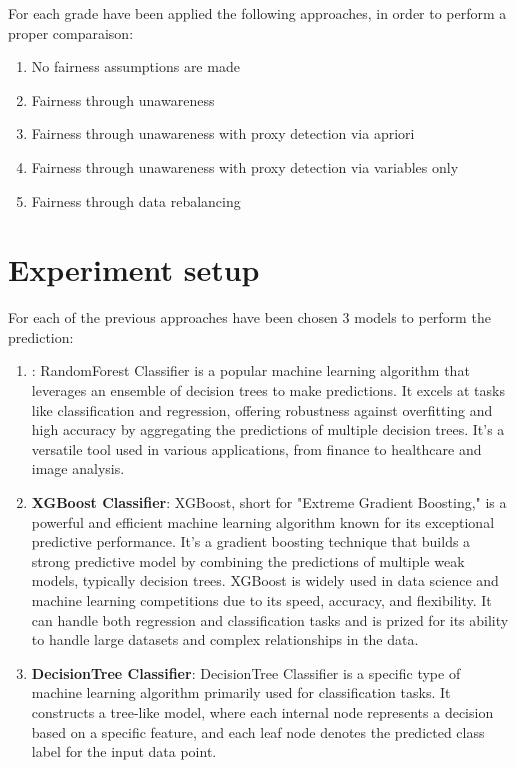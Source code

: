 \documentclass[12pt,a4paper,openright,twoside]{book}
\begin{document}
For each grade have been applied the following approaches, in order to perform a proper comparaison:
\begin{enumerate}
    \item No fairness assumptions are made
    \item Fairness through unawareness
    \item Fairness through unawareness with proxy detection via apriori
    \item Fairness through unawareness with proxy detection via variables only
    \item Fairness through data rebalancing
\end{enumerate}

\section{Experiment setup}
For each of the previous approaches have been chosen 3 models to perform the prediction:
\begin{enumerate}
    \item {}: RandomForest Classifier is a popular machine learning algorithm that leverages an ensemble of decision trees to make predictions. It excels at tasks like classification and regression, offering robustness against overfitting and high accuracy by aggregating the predictions of multiple decision trees. It's a versatile tool used in various applications, from finance to healthcare and image analysis.
    \item \textbf{XGBoost Classifier}: XGBoost, short for "Extreme Gradient Boosting," is a powerful and efficient machine learning algorithm known for its exceptional predictive performance. It's a gradient boosting technique that builds a strong predictive model by combining the predictions of multiple weak models, typically decision trees. XGBoost is widely used in data science and machine learning competitions due to its speed, accuracy, and flexibility. It can handle both regression and classification tasks and is prized for its ability to handle large datasets and complex relationships in the data.
    \item \textbf{DecisionTree Classifier}: DecisionTree Classifier is a specific type of machine learning algorithm primarily used for classification tasks. It constructs a tree-like model, where each internal node represents a decision based on a specific feature, and each leaf node denotes the predicted class label for the input data point.
\end{enumerate}
\end{document}

